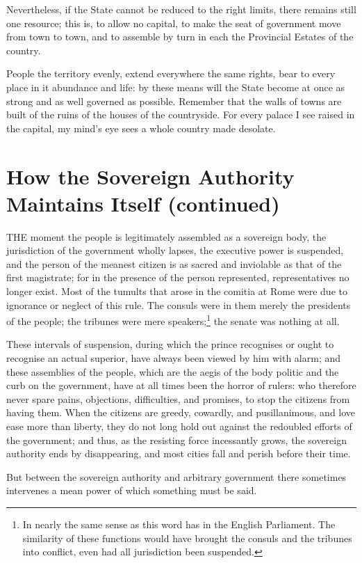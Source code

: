 \documentclass[12pt]{report}
\begin{document}
Nevertheless, if the State cannot be reduced to the right limits, there remains still one resource; this is, to allow no capital, to make the seat of government move from town to town, and to assemble by turn in each the Provincial Estates of the country.

People the territory evenly, extend everywhere the same rights, bear to every place in it abundance and life: by these means will the State become at once as strong and as well governed as possible. Remember that the walls of towns are built of the ruins of the houses of the countryside. For every palace I see raised in the capital, my mind's eye sees a whole country made desolate.

\section{How the Sovereign Authority Maintains Itself (continued)}

THE moment the people is legitimately assembled as a sovereign body, the jurisdiction of the government wholly lapses, the executive power is suspended, and the person of the meanest citizen is as sacred and inviolable as that of the first magistrate; for in the presence of the person represented, representatives no longer exist. Most of the tumults that arose in the comitia at Rome were due to ignorance or neglect of this rule. The consuls were in them merely the presidents of the people; the tribunes were mere speakers;\footnote{In nearly the same sense as this word has in the English Parliament. The similarity of these functions would have brought the consuls and the tribunes into conflict, even had all jurisdiction been suspended.} the senate was nothing at all.

These intervals of suspension, during which the prince recognises or ought to recognise an actual superior, have always been viewed by him with alarm; and these assemblies of the people, which are the aegis of the body politic and the curb on the government, have at all times been the horror of rulers: who therefore never spare pains, objections, difficulties, and promises, to stop the citizens from having them. When the citizens are greedy, cowardly, and pusillanimous, and love ease more than liberty, they do not long hold out against the redoubled efforts of the government; and thus, as the resisting force incessantly grows, the sovereign authority ends by disappearing, and most cities fall and perish before their time.

But between the sovereign authority and arbitrary government there sometimes intervenes a mean power of which something must be said.
\end{document}
